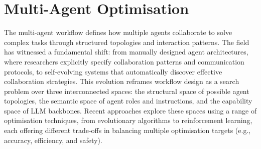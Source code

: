 \documentclass[]{selfevolagent}
\theoremstyle{plain}
\theoremstyle{definition}
\theoremstyle{remark}
\begin{document}
\section{Multi-Agent Optimisation} 
\label{sec:multi_agent_optimisation}
% 


The multi-agent workflow defines how multiple agents collaborate to solve complex tasks through structured topologies and interaction patterns. The field has witnessed a fundamental shift: from manually designed agent architectures, where researchers explicitly specify collaboration patterns and communication protocols, to self-evolving systems that automatically discover effective collaboration strategies. This evolution reframes workflow design as a search problem over three interconnected spaces: the structural space of possible agent topologies, the semantic space of agent roles and instructions, and the capability space of LLM backbones. Recent approaches explore these spaces using a range of optimisation techniques, from evolutionary algorithms to reinforcement learning, each offering different trade-offs in balancing multiple optimisation targets (e.g., accuracy, efficiency, and safety).
\end{document}
